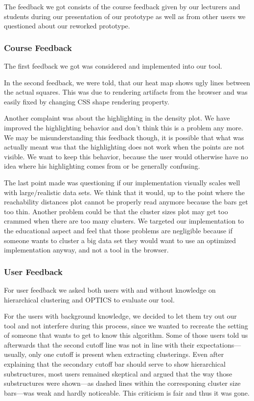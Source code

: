 \documentclass{vgtc} %
\begin{document}
The feedback we got consists of the course feedback given by our lecturers and
students during our presentation of our prototype as well as from other users
we questioned about our reworked prototype.

\subsubsection{Course Feedback}

The first feedback we got was considered and implemented into our tool.

In the second feedback, we were told, that our heat map shows ugly lines
between the actual squares.  This was due to rendering artifacts from the
browser and was easily fixed by changing CSS shape rendering property.

Another complaint was about the highlighting in the density plot. We have
improved the highlighting behavior and don't think this is a problem any more.
We may be misunderstanding this feedback though, it is possible that what was
actually meant was that the highlighting does not work when the points are not
visible. We want to keep this behavior, because the user would otherwise have
no idea where his highlighting comes from or be generally confusing.

The last point made was questioning if our implementation visually scales well
with large/realistic data sets. We think that it would, up to the point where
the reachability distances plot cannot be properly read anymore because the
bars get too thin. Another problem could be that the cluster sizes plot may get
too crammed when there are too many clusters. We targeted our implementation to the
educational aspect and feel that those problems are negligible because if
someone wants to cluster a big data set they would want to use an optimized
implementation anyway, and not a tool in the browser.

\subsubsection{User Feedback}

For user feedback we asked both users with and without knowledge on hierarchical
clustering and OPTICS to evaluate our tool.

For the users with background knowledge, we decided to let them try out our
tool and not interfere during this process, since we wanted to recreate the
setting of someone that wants to get to know this algorithm. Some of those
users told us afterwards that the second cutoff line was not in line with their
expectations---usually, only one cutoff is present when extracting clusterings.
Even after explaining that the secondary cutoff bar should serve to show hierarchical
substructures, most users remained skeptical and argued that the way those substructures
were shown---as dashed lines within the corresponing cluster size bars---was weak and
hardly noticeable. This criticism is fair and thus it was gone.
\end{document}
